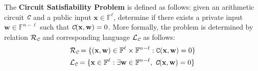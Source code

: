 \documentclass[../../book.tex]{subfiles}
\begin{document}
\begin{definition}
    The \textbf{Circuit Satisfiability Problem} is defined as follows: given an
    arithmetic circuit $\textit{\texttt{C}}$ and a public input $\mathbf{x} \in
    \mathbb{F}^{\ell}$, determine if there exists a private input $\mathbf{w}
    \in \mathbb{F}^{n-\ell}$ such that $\textit{\texttt{C}}(\mathbf{x},\mathbf{w}) = 0$. More
    formally, the problem is determined by relation $\mathcal{R}_{\textit{\texttt{C}}}$ and
    corresponding language $\mathcal{L}_{\textit{\texttt{C}}}$ as follows:
    \begin{equation*}
        \begin{aligned}
            &\mathcal{R}_{\textit{\texttt{C}}} = \{(\mathbf{x},\mathbf{w}) \in \mathbb{F}^{\ell} \times \mathbb{F}^{n-\ell}: \mathtt{C}(\mathbf{x},\mathbf{w}) = 0\} \\
            &\mathcal{L}_{\textit{\texttt{C}}} = \{\mathbf{x} \in \mathbb{F}^{\ell}: \exists \mathbf{w} \in \mathbb{F}^{n-\ell},\; \textit{\texttt{C}}(\mathbf{x},\mathbf{w}) = 0\}            
        \end{aligned}
    \end{equation*}
\end{definition}
\end{document}
